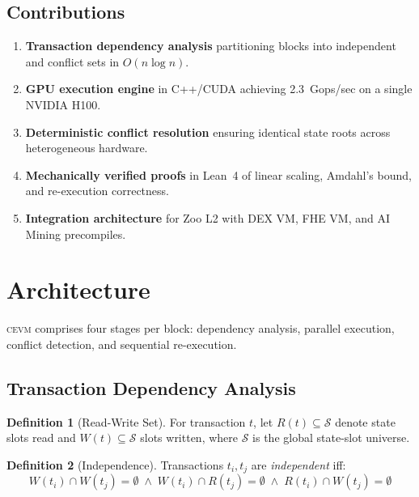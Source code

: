 \documentclass[11pt,letterpaper]{article}
\theoremstyle{definition}
\newtheorem{definition}{Definition}
\theoremstyle{remark}
\newcommand{\cevm}{\textsc{cevm}}
\begin{document}
\subsection{Contributions}

\begin{enumerate}[leftmargin=*]
\item \textbf{Transaction dependency analysis} partitioning blocks into independent and conflict sets in $O(n \log n)$.
\item \textbf{GPU execution engine} in C++/CUDA achieving 2.3~Gops/sec on a single NVIDIA H100.
\item \textbf{Deterministic conflict resolution} ensuring identical state roots across heterogeneous hardware.
\item \textbf{Mechanically verified proofs} in Lean~4 of linear scaling, Amdahl's bound, and re-execution correctness.
\item \textbf{Integration architecture} for Zoo L2 with DEX VM, FHE VM, and AI Mining precompiles.
\end{enumerate}

\section{Architecture}
\label{sec:architecture}

\cevm{} comprises four stages per block: dependency analysis, parallel execution, conflict detection, and sequential re-execution.

\subsection{Transaction Dependency Analysis}

\begin{definition}[Read-Write Set]
For transaction $t$, let $R(t) \subseteq \mathcal{S}$ denote state slots read and $W(t) \subseteq \mathcal{S}$ slots written, where $\mathcal{S}$ is the global state-slot universe.
\end{definition}

\begin{definition}[Independence]
Transactions $t_i, t_j$ are \emph{independent} iff:
\begin{equation}
W(t_i) \cap W(t_j) = \emptyset \;\wedge\; W(t_i) \cap R(t_j) = \emptyset \;\wedge\; R(t_i) \cap W(t_j) = \emptyset
\end{equation}
\end{definition}
\end{document}
